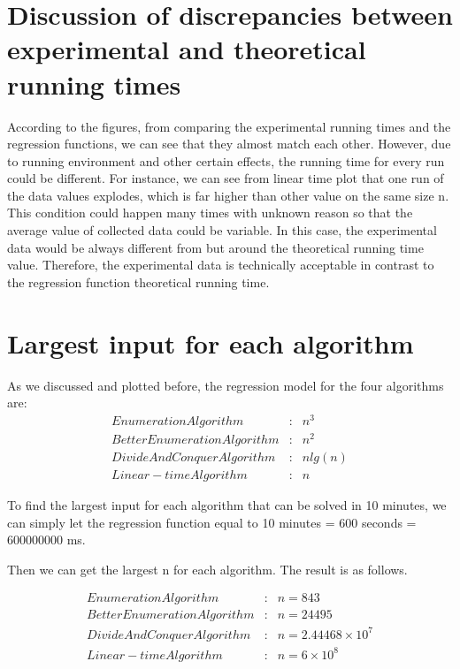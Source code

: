 \documentclass[11pt]{scrreprt}
\begin{document}
\section{Discussion of discrepancies between experimental and theoretical running times}

According to the figures, from comparing the experimental running times and the regression functions, we can see that they almost match each other. However, due to running environment and other certain effects, the running time for every run could be different. For instance, we can see from linear time plot that one run of the data values explodes, which is far higher than other value on the same size n. This condition could happen many times with unknown reason so that the average value of collected data could be variable. In this case, the experimental data would be always different from but around the theoretical running time value. Therefore, the experimental data is technically acceptable in contrast to the regression function theoretical running time. 


\section{Largest input for each algorithm}

As we discussed and plotted before, the regression model for the four algorithms are:
\begin{eqnarray*}
Enumeration Algorithm&:& n^3\\
Better Enumeration Algorithm&:& n^2\\
Divide And Conquer Algorithm&:& nlg(n)\\
Linear-time Algorithm&:& n
\end{eqnarray*}

To find the largest input for each algorithm that can be solved in 10 minutes, we can simply let the regression function equal to 10 minutes = 600 seconds = 600000000 ms.

Then we can get the largest n for each algorithm. The result is as follows.

\begin{eqnarray*}
Enumeration Algorithm&:& n = 843\\
Better Enumeration Algorithm&:& n = 24495\\
Divide And Conquer Algorithm&:& n = 2.44468\times10^7\\
Linear-time Algorithm&:& n = 6\times10^8
\end{eqnarray*}
\end{document}
